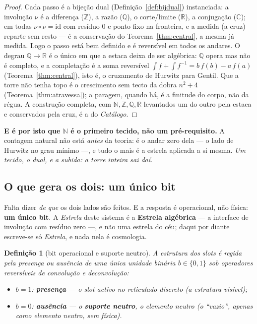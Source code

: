 \documentclass[11pt,a4paper]{article}
\newtheorem{definicao}[teorema]{Definição}
\begin{document}
\begin{proof}
Cada passo é a bijeção dual (Definição~\ref{def:bijdual}) instanciada: a involução $\nu$ é a diferença
($\mathbb{Z}$), a razão ($\mathbb{Q}$), o corte/limite ($\mathbb{R}$), a conjugação ($\mathbb{C}$); em todas $\nu\circ\nu=\mathrm{id}$
com resíduo $0$ e ponto fixo na fronteira, e a medida (a cruz) reparte sem resto --- é a conservação do
Teorema~\ref{thm:central}, a mesma já medida. Logo o passo está bem definido e é reversível em todos os
andares. O degrau $\mathbb{Q}\to\mathbb{R}$ é o único em que a estaca deixa de ser algébrica: $\mathbb{Q}$ opera mas não é
completo, e a completação é a soma reversível $\int f+\int f^{-1}=b\,f(b)-a\,f(a)$ (Teorema~\ref{thm:central}),
isto é, o cruzamento de Hurwitz para Gentil. Que a torre não tenha topo é o crescimento sem tecto da
dobra $n^2+4$ (Teorema~\ref{thm:atravessa}); a paragem, quando há, é a finitude do corpo, não da
régua. A construção completa, com $\mathbb{N},\mathbb{Z},\mathbb{Q},\mathbb{R}$ levantados um do outro pela estaca e conservados pela
cruz, é a do \emph{Catálogo}.
\end{proof}

\noindent \textbf{E é por isto que $\mathbb{N}$ é o primeiro tecido, não um pré-requisito.} A contagem natural
não está \emph{antes} da teoria: é o andar zero dela --- o lado de Hurwitz no grau mínimo ---, e tudo o
mais é a estrela aplicada a si mesma. \emph{Um tecido, o dual, e a subida: a torre inteira sai daí.}

\subsection*{O que gera os dois: um único bit}\label{sub:bit}

Falta dizer \emph{de que} os dois lados são feitos. E a resposta é operacional, não física: \textbf{um
único bit}. A \emph{Estrela} deste sistema é a \textbf{Estrela algébrica} --- a interface de involução
com resíduo zero ---, e não uma estrela do céu; daqui por diante escreve-se só \emph{Estrela}, e nada
nela é cosmologia.

\begin{definicao}[bit operacional e suporte neutro]\label{def:bit}
A estrutura dos slots é regida pela presença ou ausência de uma única unidade binária $b\in\{0,1\}$ sob
operadores reversíveis de \emph{convolução} e \emph{deconvolução}:
\begin{itemize}
\item $b=1$: \textbf{presença} --- o slot activo no reticulado discreto (a estrutura visível);
\item $b=0$: \textbf{ausência} --- o \textbf{suporte neutro}, o elemento neutro (o ``vazio'', apenas
como elemento neutro, sem física).
\end{itemize}
\end{definicao}
\end{document}
